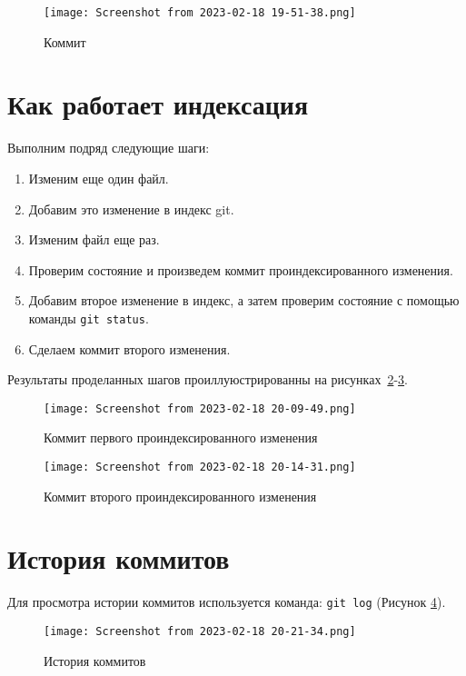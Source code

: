 \begin{figure}[h!tp]
	\centering
	\texttt{[image: Screenshot from 2023-02-18 19-51-38.png]}
	\caption{Коммит}
	\label{fig:git:second_commit}
\end{figure}

\section{Как работает индексация}
Выполним подряд следующие шаги:
\begin{enumerate}
	\item Изменим еще один файл.
	\item Добавим это изменение в индекс git.
	\item Изменим файл еще раз.
	\item Проверим состояние и произведем коммит проиндексированного
		изменения.
	\item Добавим второе изменение в индекс,
		а затем проверим состояние с помощью команды \texttt{git~status}.
	\item Сделаем коммит второго изменения.
\end{enumerate}

Результаты проделанных шагов проиллуюстрированны на
рисунках~\ref{fig:git:first_indexed_change}-\ref{fig:git:second_indexed_change}.

\begin{figure}[h!tp]
	\centering
	\texttt{[image: Screenshot from 2023-02-18 20-09-49.png]}
	\caption{Коммит первого проиндексированного изменения}
	\label{fig:git:first_indexed_change}
\end{figure}

\begin{figure}[h!tp]
	\centering
	\texttt{[image: Screenshot from 2023-02-18 20-14-31.png]}
	\caption{Коммит второго проиндексированного изменения}
	\label{fig:git:second_indexed_change}
\end{figure}

\section{История коммитов}
Для просмотра истории коммитов используется команда: \texttt{git~log}
(Рисунок \ref{fig:git:log}).

\begin{figure}[h!tp]
	\centering
	\texttt{[image: Screenshot from 2023-02-18 20-21-34.png]}
	\caption{История коммитов}
	\label{fig:git:log}
\end{figure}


